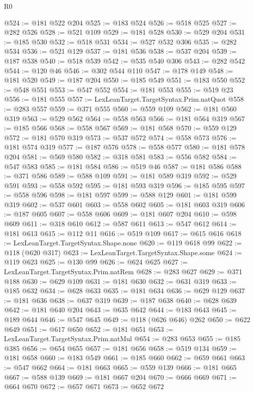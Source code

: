 \begin{lexlean}{R0}
\begin{coremodule}
@524 := @181 @522 @204
@525 := @183 @524
@526 := @518 @525
@527 := @282 @526
@528 := @521 @109
@529 := @181 @528
@530 := @529 @204
@531 := @185 @530
@532 := @518 @531
@534 := @527 @532 @306
@535 := @282 @534
@536 := @521 @129
@537 := @181 @536
@538 := @537 @204
@539 := @187 @538
@540 := @518 @539
@542 := @535 @540 @306
@543 := @282 @542
@544 := @120 @46
@546 := @302 @544 @110
@547 := @178 @149
@548 := @181 @520
@549 := @187 @204
@550 := @185 @549
@551 := @183 @550
@552 := @548 @551
@553 := @547 @552
@554 := @181 @553
@555 := @519 @23
@556 := @181 @555
@557 := LexLeanTarget.TargetSyntax.Prim.natQuot
@558 := @283 @557
@559 := @371 @555
@560 := @559 @109
@562 := @181 @560 @319
@563 := @529 @562
@564 := @558 @563
@566 := @181 @564 @319
@567 := @185 @566
@568 := @558 @567
@569 := @181 @568
@570 := @559 @129
@572 := @181 @570 @319
@573 := @537 @572
@574 := @558 @573
@576 := @181 @574 @319
@577 := @187 @576
@578 := @558 @577
@580 := @181 @578 @204
@581 := @569 @580
@582 := @318 @581
@583 := @556 @582
@584 := @547 @583
@585 := @181 @584
@586 := @519 @46
@587 := @181 @586
@588 := @371 @586
@589 := @588 @109
@591 := @181 @589 @319
@592 := @529 @591
@593 := @558 @592
@595 := @181 @593 @319
@596 := @185 @595
@597 := @558 @596
@598 := @181 @597
@599 := @588 @129
@601 := @181 @599 @319
@602 := @537 @601
@603 := @558 @602
@605 := @181 @603 @319
@606 := @187 @605
@607 := @558 @606
@609 := @181 @607 @204
@610 := @598 @609
@611 := @318 @610
@612 := @587 @611
@613 := @547 @612
@614 := @181 @613
@615 := @112 @11
@616 := @519 @109
@617 := @615 @616
@618 := LexLeanTarget.TargetSyntax.Shape.none
@620 := @119 @618 @99
@622 := @118 (@620 @317)
@623 := LexLeanTarget.TargetSyntax.Shape.some
@624 := @119 @623
@625 := @130 @99
@626 := @624 @625
@627 := LexLeanTarget.TargetSyntax.Prim.natRem
@628 := @283 @627
@629 := @371 @188
@630 := @629 @109
@631 := @181 @630
@632 := @631 @319
@633 := @185 @632
@634 := @628 @633
@635 := @181 @634
@636 := @629 @129
@637 := @181 @636
@638 := @637 @319
@639 := @187 @638
@640 := @628 @639
@642 := @181 @640 @204
@643 := @635 @642
@644 := @183 @643
@645 := @189 @644
@646 := @547 @645
@649 := @118 (@626 @646) @262
@650 := @622 @649
@651 := @617 @650
@652 := @181 @651
@653 := LexLeanTarget.TargetSyntax.Prim.natMul
@654 := @283 @653
@655 := @185 @385
@656 := @654 @655
@657 := @181 @656
@658 := @519 @134
@659 := @181 @658
@660 := @183 @549
@661 := @185 @660
@662 := @659 @661
@663 := @547 @662
@664 := @181 @663
@665 := @559 @139
@666 := @181 @665
@667 := @588 @139
@669 := @181 @667 @204
@670 := @666 @669
@671 := @664 @670
@672 := @657 @671
@673 := @652 @672

\end{coremodule}
\end{lexlean}

